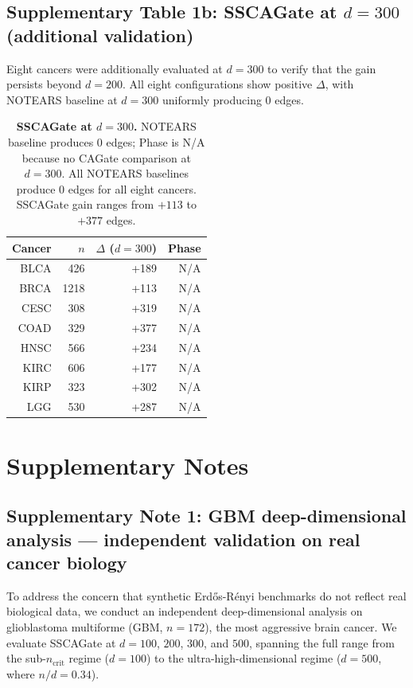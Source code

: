 \documentclass[12pt,a4paper]{article}
\begin{document}
\subsection{Supplementary Table 1b: SSCAGate at $d = 300$ (additional validation)}
\label{sec:stab1b}

Eight cancers were additionally evaluated at $d = 300$ to verify that the gain
persists beyond $d = 200$. All eight configurations show positive $\Delta$, with
NOTEARS baseline at $d = 300$ uniformly producing 0 edges.

\begin{table}[htbp]
\centering
\caption{\textbf{SSCAGate at $d = 300$.} NOTEARS baseline produces 0 edges; Phase is N/A because no CAGate comparison at $d=300$. All NOTEARS baselines produce 0 edges
for all eight cancers. SSCAGate gain ranges from $+113$ to $+377$ edges.}
\label{tab:s1b_d300}
\begin{tabular}{rrrr}
\toprule
Cancer & $n$ & $\Delta$ ($d=300$) & Phase \\
\midrule
BLCA & 426 & +189 & N/A \\
BRCA & 1218 & +113 & N/A \\
CESC & 308 & +319 & N/A \\
COAD & 329 & +377 & N/A \\
HNSC & 566 & +234 & N/A \\
KIRC & 606 & +177 & N/A \\
KIRP & 323 & +302 & N/A \\
LGG & 530 & +287 & N/A \\\bottomrule
\end{tabular}
\end{table}


\section{Supplementary Notes}

\subsection{Supplementary Note 1: GBM deep-dimensional analysis --- independent validation on real cancer biology}
\label{sec:note1}

To address the concern that synthetic Erd\H{o}s-R\'{e}nyi benchmarks do not
reflect real biological data, we conduct an independent deep-dimensional analysis
on glioblastoma multiforme (GBM, $n = 172$), the most aggressive brain cancer.
We evaluate SSCAGate at $d = 100$, $200$, $300$, and $500$, spanning the full
range from the sub-$n_{\text{crit}}$ regime ($d = 100$) to the ultra-high-dimensional
regime ($d = 500$, where $n/d = 0.34$).
\end{document}
